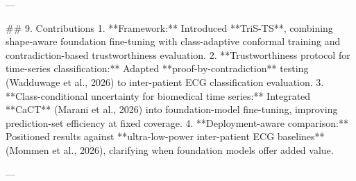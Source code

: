 ---

## 9. Contributions  
1. **Framework:** Introduced **TriS-TS**, combining shape-aware foundation fine-tuning with class-adaptive conformal training and contradiction-based trustworthiness evaluation.  
2. **Trustworthiness protocol for time-series classification:** Adapted **proof-by-contradiction** testing (Wadduwage et al., 2026) to inter-patient ECG classification evaluation.  
3. **Class-conditional uncertainty for biomedical time series:** Integrated **CaCT** (Marani et al., 2026) into foundation-model fine-tuning, improving prediction-set efficiency at fixed coverage.  
4. **Deployment-aware comparison:** Positioned results against **ultra-low-power inter-patient ECG baselines** (Mommen et al., 2026), clarifying when foundation models offer added value.

---